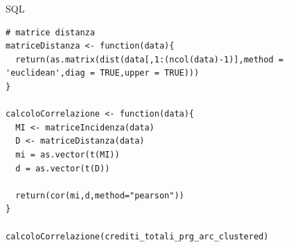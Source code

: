 \documentclass{beamer}
\begin{document}
\begin{frame}[fragile]{SQL}
\begin{lstlisting}[style = R]
# matrice distanza
matriceDistanza <- function(data){
  return(as.matrix(dist(data[,1:(ncol(data)-1)],method = 'euclidean',diag = TRUE,upper = TRUE)))
}

calcoloCorrelazione <- function(data){
  MI <- matriceIncidenza(data)
  D <- matriceDistanza(data)
  mi = as.vector(t(MI))
  d = as.vector(t(D))
  
  return(cor(mi,d,method="pearson"))
}

calcoloCorrelazione(crediti_totali_prg_arc_clustered)
\end{lstlisting}
\end{frame}
\end{document}
